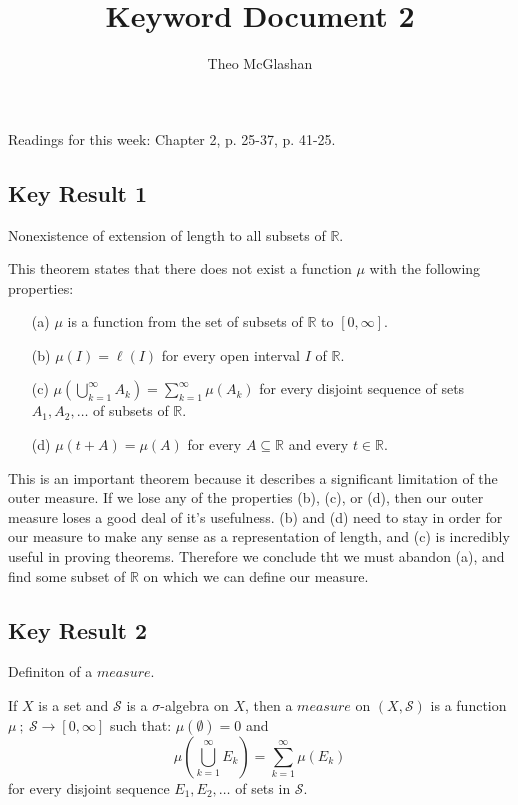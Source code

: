 \documentclass[12pt]{article}
\title{Keyword Document 2}
\author{Theo McGlashan}
\date{}
\begin{document}
\maketitle

Readings for this week: Chapter 2, p. 25-37, p. 41-25.

\subsection*{Key Result 1}

Nonexistence of extension of length to all subsets of $\mathbb{R}$.

This theorem states that there does not exist a function $\mu$ with the following properties: 
\begin{itemize}
    \item[(a)] $\mu$ is a function from the set of subsets of $\mathbb{R}$ to $[0, \infty]$.
    \item[(b)] $\mu (I) = \ell (I)$ for every open interval $I$ of $\mathbb{R}$.
    \item[(c)] $\mu \left( \bigcup_{k=1}^\infty A_k \right) = \sum_{k=1}^\infty \mu (A_k)$ for every disjoint sequence of sets $A_1, A_2, \ldots$ of subsets of $\mathbb{R}$.
    \item[(d)] $\mu (t+A) = \mu (A)$ for every $A \subseteq \mathbb{R}$ and every $t \in \mathbb{R}$.
\end{itemize}

This is an important theorem because it describes a significant limitation of the outer measure. If we lose any of the properties (b), (c), or (d), then our outer measure loses a good deal of it's usefulness. (b) and (d) need to stay in order for our measure to make any sense as a representation of length, and (c) is incredibly useful in proving theorems. Therefore we conclude tht we must abandon (a), and find some subset of $\mathbb{R}$ on which we can define our measure.

\subsection*{Key Result 2}

Definiton of a $measure$.

If $X$ is a set and $\mathcal{S}$ is a $\sigma$-algebra on $X$, then a $measure$ on $(X, \mathcal{S})$ is a function $\mu ~;~ \mathcal{S} \to [0, \infty]$ such that: $\mu(\emptyset) = 0$ and $$\mu \left( \bigcup_{k=1}^\infty E_k \right) = \sum_{k=1}^\infty \mu (E_k)$$ for every disjoint sequence $E_1, E_2, \ldots$ of sets in $\mathcal{S}$.
\end{document}
